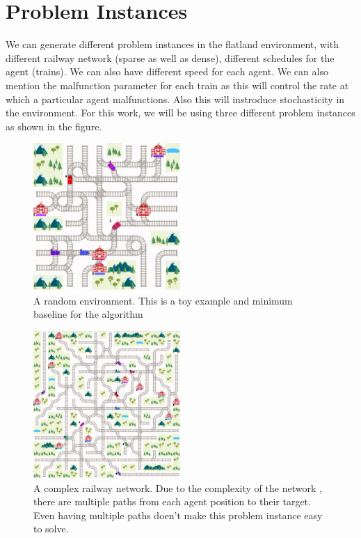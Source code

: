 \section{Problem Instances}
We can generate different problem instances in the flatland environment, with different railway network 
(sparse as well as dense), different schedules for the agent (trains).
We can also have different speed 
for each agent.
We can also mention the malfunction parameter for each train as this will control the 
rate at which a particular agent malfunctions. Also this will instroduce stochasticity in the environment.
For this work, we will be using three different problem instances as shown in the figure.


\begin{figure}[h]
    \centering
    \includegraphics[width=0.5\textwidth]{flatland4}
    \caption{ A random environment. This is a toy example and minimum baseline for the algorithm\cite{WEBSITE:6} }
    \label{image-myimage2}
\end{figure}

\begin{figure}[h]
    \centering
    \includegraphics[width=0.5\textwidth]{flatland3}
    \caption{ A complex railway network. Due to the complexity of the network , there are 
    multiple paths from each agent position to their target. Even having multiple paths doen't make 
    this problem instance easy to solve\cite{WEBSITE:6}. }
    \label{image-myimage2}
\end{figure}


